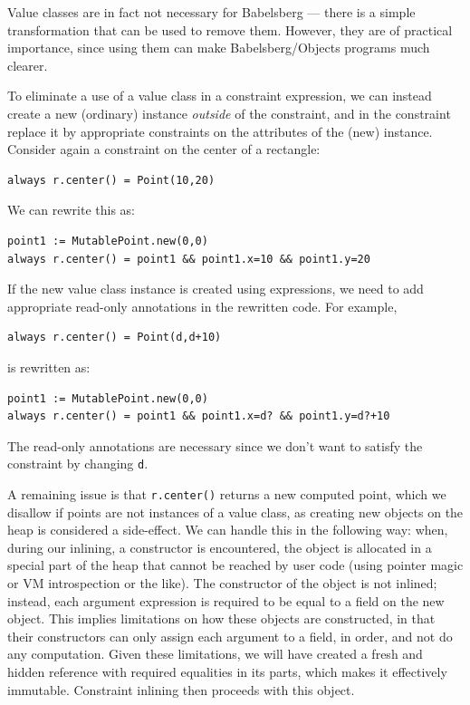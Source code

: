 \documentclass{article}
\begin{document}
Value classes are in fact not necessary for Babelsberg --- there is a
simple transformation that can be used to remove them.  However, they
are of practical importance, since using them can make
Babelsberg/Objects programs much clearer.

To eliminate a use of a value class in a constraint expression, we can
instead create a new (ordinary) instance \emph{outside} of the
constraint, and in the constraint replace it by appropriate
constraints on the attributes of the (new) instance.  Consider again a
constraint on the center of a rectangle:

\begin{verbatim}
always r.center() = Point(10,20)
\end{verbatim}

We can rewrite this as:
\begin{verbatim}
point1 := MutablePoint.new(0,0)
always r.center() = point1 && point1.x=10 && point1.y=20
\end{verbatim}

If the new value class instance is created using expressions, we need
to add appropriate read-only annotations in the rewritten code.  For example,
\begin{verbatim}
always r.center() = Point(d,d+10)
\end{verbatim}

is rewritten as:
\begin{verbatim}
point1 := MutablePoint.new(0,0)
always r.center() = point1 && point1.x=d? && point1.y=d?+10
\end{verbatim}

The read-only annotations are necessary since we don't want to satisfy
the constraint by changing \verb|d|.

A remaining issue is that \verb!r.center()! returns a new
computed point, which we disallow if points are not instances of a
value class, as creating new objects on the heap
is considered a side-effect. We can handle this in the following way:
when, during our inlining, a constructor is encountered, the object is
allocated in a special part of the heap that cannot be reached by user
code (using pointer magic or VM introspection or the like). The
constructor of the object is not inlined; instead, each argument
expression is required to be equal to a field on the new object. This
implies limitations on how these objects are constructed, in that
their constructors can only assign each argument to a field, in order,
and not do any computation. Given these limitations, we will have
created a fresh and hidden reference with required equalities in its
parts, which makes it effectively immutable. Constraint inlining then
proceeds with this object.
\end{document}
